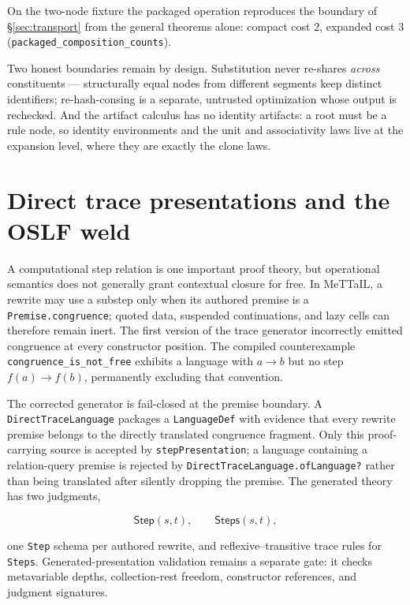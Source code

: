 \documentclass[]{article}
\theoremstyle{remark}
\newcommand{\code}[1]{\texttt{#1}}
\newcommand{\MeTTaIL}{\textup{MeTTaIL}}
\newcommand{\OSLF}{\textup{OSLF}}
\begin{document}
\noindent
On the two-node fixture the packaged operation reproduces the boundary of
\S\ref{sec:transport} from the general theorems alone: compact cost $2$,
expanded cost $3$ (\code{packaged\_composition\_counts}).

Two honest boundaries remain by design.  Substitution never re-shares
\emph{across} constituents --- structurally equal nodes from different
segments keep distinct identifiers; re-hash-consing is a separate,
untrusted optimization whose output is rechecked.  And the artifact
calculus has no identity artifacts: a root must be a rule node, so identity
environments and the unit and associativity laws live at the expansion
level, where they are exactly the clone laws.

\section{Direct trace presentations and the \OSLF{} weld}
\label{sec:trace}

A computational step relation is one important proof theory, but operational
semantics does not generally grant contextual closure for free.  In
\MeTTaIL{}, a rewrite may use a substep only when its authored premise is a
\code{Premise.congruence}; quoted data, suspended continuations, and lazy
cells can therefore remain inert.  The first version of the trace generator
incorrectly emitted congruence at every constructor position.  The compiled
counterexample \code{congruence\_is\_not\_free} exhibits a language with
$a\to b$ but no step $f(a)\to f(b)$, permanently excluding that convention.

The corrected generator is fail-closed at the premise boundary.  A
\code{DirectTraceLanguage} packages a \code{LanguageDef} with evidence that
every rewrite premise belongs to the directly translated congruence
fragment.  Only this proof-carrying source is accepted by
\code{stepPresentation}; a language containing a relation-query premise is
rejected by \code{DirectTraceLanguage.ofLanguage?} rather than being
translated after silently dropping the premise.  The generated theory has
two judgments,

\[
  \mathsf{Step}(s,t), \qquad \mathsf{Steps}(s,t),
\]

one \code{Step} schema per authored rewrite, and reflexive--transitive trace
rules for \code{Steps}.  Generated-presentation validation remains a separate
gate: it checks metavariable depths, collection-rest freedom, constructor
references, and judgment signatures.
\end{document}
